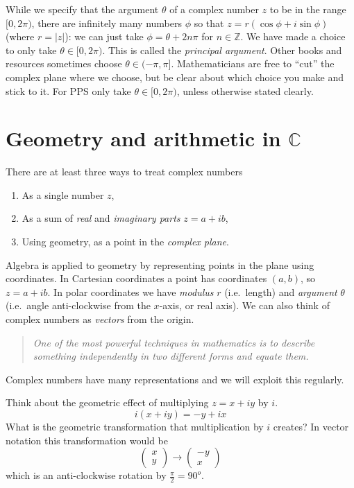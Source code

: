 \documentclass[11pt,dvipsnames]{book}
\numberwithin{figure}{section} %
\numberwithin{table}{section} %
\begin{document}
While we specify that the argument $\theta$ of a complex number $z$ to be in the range $[0,2\pi)$, there are infinitely many numbers $\phi$ so that $z= r(\cos\phi+i\sin\phi)$ (where $r=|z|$): we can just take $\phi = \theta+ 2n\pi$ for $n\in\mathbb{Z}$.
We have made a choice to only take $\theta\in [0,2\pi)$.  This is called the {\em principal argument}.
Other books and resources sometimes choose $\theta\in (-\pi,\pi]$.
Mathematicians are free to ``cut'' the complex plane where we choose, but be clear about which choice you make and stick to it.
For PPS only take $\theta\in [0,2\pi)$, unless otherwise stated clearly.

\section{Geometry and arithmetic in \(\mathbb{C}\)}

There are at least three ways to treat complex numbers
\begin{enumerate}
  \item As a single number $z$,
  \item As a sum of {\em real} and {\em imaginary parts} $z=a+ib$,
  \item Using geometry, as a point in the {\em complex plane}.
\end{enumerate}
Algebra is applied to geometry by representing points in the plane using coordinates.
In Cartesian coordinates a point has coordinates $(a,b)$, so \(z=a+ib\).
In polar coordinates we have {\em modulus} $r$ (i.e.~length) and {\em argument} $\theta$ (i.e.~angle anti-clockwise from the $x$-axis, or real axis).
We can also think of complex numbers as {\em vectors} from the origin.
\begin{quote}
    {\em One of the most powerful techniques in mathematics is to describe something independently in two different forms and equate them.}
\end{quote}
Complex numbers have many representations and we will exploit this regularly.

Think about the geometric effect of multiplying \(z=x+iy\) by \(i\).
\[ i(x+iy)=-y+ix\]
What is the geometric transformation that multiplication by \(i\) creates?
In vector notation this transformation would be
\[ \begin{pmatrix} x \\ y \end{pmatrix} \rightarrow \begin{pmatrix} -y \\ x \end{pmatrix}\]
which is an anti-clockwise rotation by \(\frac{\pi}{2}=90^o\).
\end{document}
